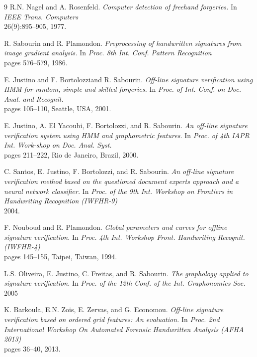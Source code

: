 \begin{thebibliography}{9}
R.N. Nagel and A. Rosenfeld.
\textit{ Computer detection of freehand forgeries. } In \textit{IEEE Trans. Computers} \\
26(9):895–905, 1977.

R. Sabourin and R. Plamondon.
\textit{ Preprocessing of handwritten signatures from image gradient analysis. } In \textit{Proc. 8th Int. Conf. Pattern Recognition} \\
pages 576–579, 1986.

E. Justino and F. Bortolozziand R. Sabourin.
\textit{ Off-line signature verification using HMM for random, simple and skilled forgeries. } In \textit{Proc. of Int. Conf. on Doc. Anal. and Recognit.} \\
pages 105–110, Seattle, USA, 2001.

E. Justino, A. El Yacoubi, F. Bortolozzi, and R. Sabourin.
\textit{ An off-line signature verification system using HMM and graphometric features. } In \textit{Proc. of 4th IAPR Int. Work-shop on Doc. Anal. Syst.} \\
pages 211–222, Rio de Janeiro, Brazil, 2000.

C. Santos, E. Justino, F. Bortolozzi, and R. Sabourin.
\textit{ An off-line signature verification method based on the questioned document experts approach and a neural network classifier.} In \textit{Proc. of the 9th Int. Workshop on Frontiers in Handwriting Recognition (IWFHR-9)} \\
2004.

F. Nouboud and R. Plamondon.
\textit{ Global parameters and curves for offline signature verification. } In \textit{Proc. 4th Int. Workshop Front. Handwriting Recognit. (IWFHR-4)} \\
pages 145–155, Taipei, Taiwan, 1994.

L.S. Oliveira, E. Justino, C. Freitas, and R. Sabourin.
\textit{ The graphology applied to signature verification.} In \textit{ Proc. of the 12th Conf. of the Int. Graphonomics Soc. } \\
2005

K. Barkoula, E.N. Zois, E. Zervas, and G. Economou.
\textit{ Off-line signature verification based on ordered grid features: An evaluation. } In \textit{Proc. 2nd International Workshop On Automated Forensic Handwritten Analysis (AFHA 2013)} \\
pages 36–40, 2013.


\end{thebibliography}
